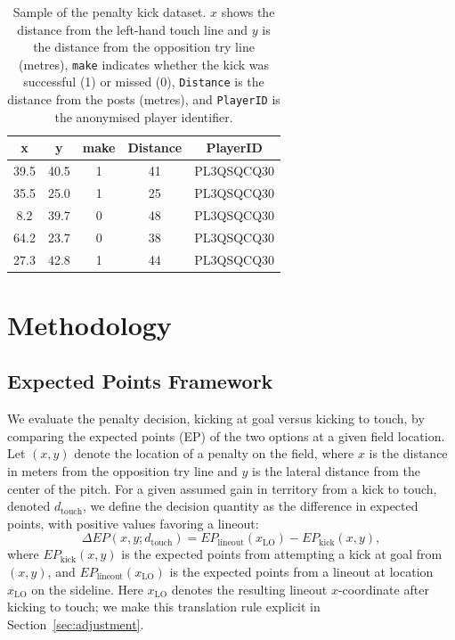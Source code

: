 \documentclass[12pt]{article}
\begin{document}
\begin{table}[h]
\centering
\begin{tabular}{ccccc}
\hline
\textbf{x} & \textbf{y} & \textbf{make} & \textbf{Distance} & \textbf{PlayerID} \\
\hline
39.5 & 40.5 & 1 & 41 & PL3QSQCQ30 \\
35.5 & 25.0 & 1 & 25 & PL3QSQCQ30 \\
8.2  & 39.7 & 0 & 48 & PL3QSQCQ30 \\
64.2 & 23.7 & 0 & 38 & PL3QSQCQ30 \\
27.3 & 42.8 & 1 & 44 & PL3QSQCQ30 \\
\hline
\end{tabular}
\caption{Sample of the penalty kick dataset. $x$ shows the distance from the left-hand touch line and $y$ is the distance from the opposition try line (metres), 
\texttt{make} indicates whether the kick was successful (1) or missed (0), 
\texttt{Distance} is the distance from the posts (metres), and \texttt{PlayerID} 
is the anonymised player identifier.}
\label{tab:kick_data}
\end{table}



\section{Methodology}

\subsection{Expected Points Framework}

We evaluate the penalty decision, kicking at goal versus kicking to touch, by comparing the expected points (EP) of the two options at a given field location. Let $(x, y)$ denote the location of a penalty on the field, where $x$ is the distance in meters from the opposition try line and $y$ is the lateral distance from the center of the pitch. For a given assumed gain in territory from a kick to touch, denoted $d_{\text{touch}}$, we define the decision quantity as the difference in expected points, with positive values favoring a lineout:
\[
\Delta EP(x, y; d_{\text{touch}}) = EP_{\text{lineout}}(x_{\text{LO}}) - EP_{\text{kick}}(x, y),
\]
where $EP_{\text{kick}}(x, y)$ is the expected points from attempting a kick at goal from $(x, y)$, and $EP_{\text{lineout}}(x_{\text{LO}})$ is the expected points from a lineout at location $x_{\text{LO}}$ on the sideline. Here $x_{\text{LO}}$ denotes the resulting lineout $x$-coordinate after kicking to touch; we make this translation rule explicit in Section~\ref{sec:adjustment}.
\end{document}
